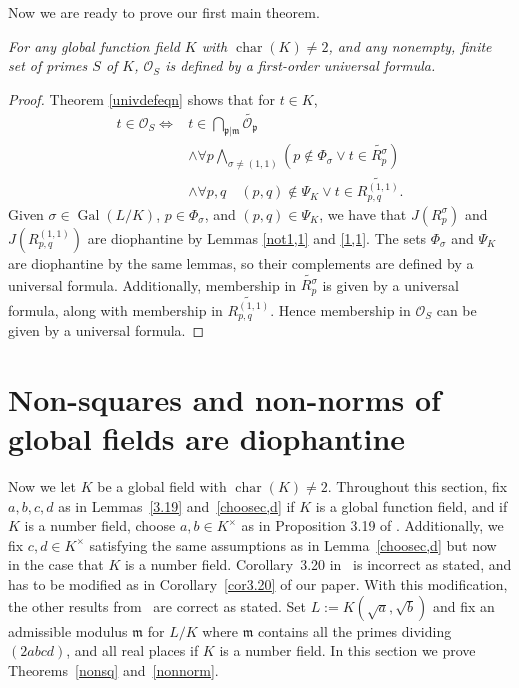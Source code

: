 \documentclass[12pt,reqno]{amsart}
\newcommand{\mm}{\mathfrak{m}}
\newcommand{\OO}{\mathcal{O}}
\newcommand{\pp}{\mathfrak{p}}
\DeclareMathOperator{\Gal}{Gal}
\DeclareMathOperator{\ch}{char}
\theoremstyle{definition}
\begin{document}
Now we are ready to prove our first main theorem.

\vspace{.5em}
\emph{ For any global function field $K$ with $\ch(K)\not=2$, and any nonempty, finite set of primes $S$ of $K$, $\OO_S$ is defined by a first-order universal formula.}



\begin{proof}
Theorem \ref{univdefeqn} shows that for $t\in K$, 
\begin{align*}
t\in \OO_S \iff&  t \in \bigcap_{\pp|\mm} \widetilde{\OO_{\pp}}  \\
&\land\forall p \bigwedge_{\sigma\not=(1,1)} (p\not\in \Phi_{\sigma} \lor t\in \widetilde{R_p^{\sigma}}) \\
&\land\forall p,q \quad (p,q)\not\in \Psi_{K} \lor t\in \widetilde{R_{p,q}^{(1,1)}}.
\end{align*}
Given $\sigma\in \Gal(L/K)$, $p\in \Phi_{\sigma}$, and $(p,q)\in \Psi_{K}$, we have that $J(R^{\sigma}_p)$ and $J(R^{(1,1)}_{p,q})$ are diophantine by Lemmas \ref{not1,1} and \ref{1,1}. The sets $\Phi_{\sigma}$ and $\Psi_K$ are diophantine by the same lemmas, so their complements are defined by a universal formula.  Additionally, membership in $\widetilde{R_p^{\sigma}}$ is given by a universal formula, along with membership in $\widetilde{R_{p,q}^{(1,1)}}$. Hence membership in $\OO_S$ can be given by a universal formula.



\end{proof}


\section{Non-squares and non-norms of global fields are diophantine}
Now we let $K$ be a global field with $\ch(K)\not=2$.  Throughout this
section, fix $a,b,c,d$ as in Lemmas~\ref{3.19} and~\ref{choosec,d} if
$K$ is a global function field, and if $K$ is a number field, choose
$a,b\in K^{\times}$ as in Proposition 3.19 of
\cite{Park}. Additionally, we fix $c,d\in K^{\times}$ satisfying the
same assumptions as in Lemma~\ref{choosec,d} but now in the case that
$K$ is a number field. Corollary~3.20 in~\cite{Park} is incorrect as
stated, and has to be modified as in
Corollary~\ref{cor3.20} of our paper. With this modification, the other results
from~\cite{Park} are correct as stated. Set $L:=K(\sqrt{a},\sqrt{b})$ and fix an
admissible modulus $\mm$ for $L/K$ where $\mm$ contains all the primes
dividing $(2abcd)$, and all real places if $K$ is a number field. In
this section we prove Theorems~\ref{nonsq} and~\ref{nonnorm}.
\end{document}
